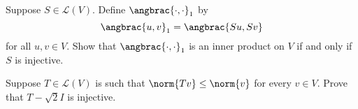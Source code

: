 \begin{solution}

\end{solution}

\begin{exercise}
Suppose $S\in\mathcal{L}(V)$. Define $\angbrac{\cdot,\cdot}_1$ by
\[\angbrac{u,v}_1=\angbrac{Su,Sv}\]
for all $u,v\in V$. Show that $\angbrac{\cdot,\cdot}_1$ is an inner product on $V$ if and only if $S$ is injective.
\end{exercise}

\begin{exercise}
Suppose $T\in\mathcal{L}(V)$ is such that $\norm{Tv}\le\norm{v}$ for every $v\in V$. Prove that $T-\sqrt{2}I$ is injective.
\end{exercise}

\begin{exercise}

\end{exercise}

\begin{exercise}

\end{exercise}

\begin{exercise}

\end{exercise}

\begin{exercise}

\end{exercise}

\begin{exercise}

\end{exercise}

\begin{exercise}

\end{exercise}

\begin{exercise}

\end{exercise}

\begin{exercise}

\end{exercise}

\begin{exercise}

\end{exercise}

